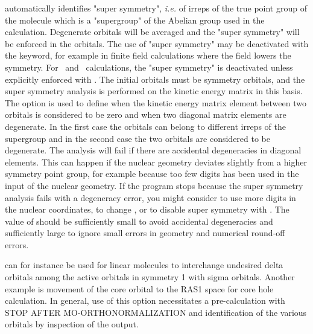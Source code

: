 {\sir} automatically identifies "super
symmetry", {\it i.e.\/} of irreps of the true point
group of the molecule which is a
"supergroup" of the Abelian group used in the calculation.
Degenerate orbitals will be averaged and the "super
symmetry" will be enforced in the orbitals.
The use of "super symmetry" may be deactivated with the
 keyword, for example in finite field
calculations where the field lowers the symmetry. \ifabacus For
\aba\ and \resp\ calculations, the "super symmetry" is deactivated
unless explicitly enforced with . \fi The initial
orbitals must be symmetry orbitals, and the super symmetry
analysis is performed on the kinetic energy matrix in this basis.
The  option is used to define when the kinetic
energy matrix element between two orbitals is considered to be
zero and when two diagonal matrix elements are degenerate. In the
first case the orbitals can belong to different irreps of the
supergroup and in the second case the two orbitals are considered
to be degenerate. The analysis will fail if there are accidental
degeneracies in diagonal elements.  This can happen if the nuclear
geometry deviates slightly from a higher symmetry point group, for
example because too few digits has been used in the input of the
nuclear geometry. If the program stops because the super symmetry
analysis fails with a degeneracy error, you might consider to use
more digits in the nuclear coordinates, to change , or
to disable super symmetry with .  The value of
 should be sufficiently small to avoid accidental
degeneracies and sufficiently large to ignore small errors in
geometry and numerical round-off errors.


 can for instance be used for
linear molecules to interchange
undesired delta orbitals among the active orbitals in symmetry 1 with
sigma orbitals.  Another example is movement of the core orbital to the
RAS1 space for core hole calculation.  In general, use of this option
necessitates a pre-calculation with STOP AFTER MO-ORTHONORMALIZATION and
identification of the various orbitals by inspection of the output.


\pagebreak[3]
\subsection{\label{ref-popinp}}

